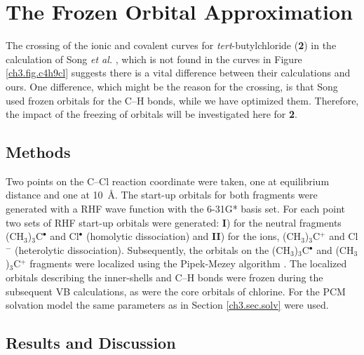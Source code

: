 \section{The Frozen Orbital Approximation}

The crossing of the ionic and covalent curves for \textit{tert}-butylchloride (\textbf{2}) in the calculation of Song \textit{et al.} \cite{song}, which is not found in the curves in Figure \ref{ch3.fig.c4h9cl} suggests there is a vital difference between their calculations and ours. One difference, which might be the reason for the crossing, is that Song used frozen orbitals for the C--H bonds, while we have optimized them. Therefore, the impact of the freezing of orbitals will be investigated here for \textbf{2}.

 \subsection{Methods}

Two points on the C--Cl reaction coordinate were taken, one at equilibrium distance and one at \mbox{10 \AA}. The start-up orbitals for both fragments were generated with a RHF wave function with the 6-31G* basis set. For each point two sets of RHF start-up orbitals were generated: \textbf{I}) for the neutral fragments (CH$_3$)$_3$C$^\bullet$ and Cl$^\bullet$ (homolytic dissociation) and \textbf{II}) for the ions, (CH$_3$)$_3$C$^{+}$ and Cl$^{-}$ (heterolytic dissociation). Subsequently, the orbitals on the (CH$_3$)$_3$C$^\bullet$ and (CH$_3$)$_3$C$^{+}$ fragments were localized using the Pipek-Mezey algorithm \cite{pipek}. The localized orbitals describing the inner-shells and C--H bonds were frozen during the subsequent VB calculations, as were the core orbitals of chlorine.  For the PCM solvation model the same parameters as in Section \ref{ch3.sec.solv} were used.

\subsection{\label{ch3.sec.res.freez}Results and Discussion}

